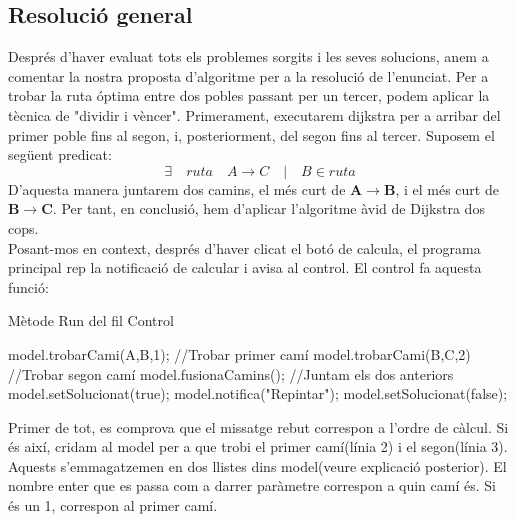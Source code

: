 \documentclass[conference]{IEEEtran}
\begin{document}
    \subsection{Resolució general}
        Després d'haver evaluat tots els problemes sorgits i les seves solucions, anem a comentar la nostra proposta d'algoritme per a la resolució de l'enunciat. Per a trobar la ruta óptima entre dos pobles passant per un tercer, podem aplicar la tècnica de "dividir i vèncer". Primerament, executarem dijkstra per a arribar del primer poble fins al segon, i, posteriorment, del segon fins al tercer. Suposem el següent predicat:\\
        $$\exists \quad ruta \quad A\rightarrow C \quad | \quad B \in ruta$$
        D'aquesta manera juntarem dos camins, el més curt de \textbf{A}$\rightarrow$\textbf{B}, i el més curt de \textbf{B}$\rightarrow$\textbf{C}. Per tant, en conclusió, hem d'aplicar l'algoritme àvid de Dijkstra dos cops. \\
    
        Posant-mos en context, després d'haver clicat el botó de calcula, el programa principal rep la notificació de calcular i avisa al control. El control fa aquesta funció:
    
        \begin{algorithm}
            \begin{algorithmic}[1]
                \caption{Mètode Run del fil Control}
                    \State model.trobarCami(A,B,1);   //Trobar primer camí
                    \State model.trobarCami(B,C,2)    //Trobar segon camí
                    \State model.fusionaCamins();    //Juntam els dos anteriors
                    \State model.setSolucionat(true);
                    \State model.notifica("Repintar");
                    \State model.setSolucionat(false);
                \EndIf
            \end{algorithmic}
        \end{algorithm}
    
        Primer de tot, es comprova que el missatge rebut correspon a l'ordre de càlcul. Si és així, cridam al model per a que trobi el primer camí(línia 2) i el segon(línia 3). Aquests s'emmagatzemen en dos llistes dins model(veure explicació posterior). El nombre enter que es passa com a darrer paràmetre correspon a quin camí és. Si és un 1, correspon al primer camí.\\
        
\end{document}
